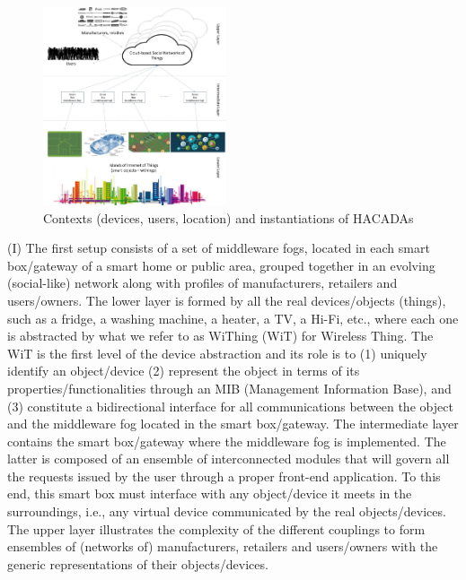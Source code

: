 \begin{figure}
	\centerline{\includegraphics[width=0.48\textwidth]{./fig2-3.jpg}}
	\vspace{-3mm} \caption{\small Contexts (devices, users, location) and instantiations of HACADAs}
	\label{fig2}
\end{figure}


(I)  The first setup consists of a set of middleware fogs, located in each smart box/gateway of a smart home or public area, grouped together in an evolving (social-like) network along with profiles of manufacturers, retailers and users/owners. The lower layer is formed by all the real devices/objects (things), such as a fridge, a washing machine, a heater, a TV, a Hi-Fi, etc., where each one is abstracted by what we refer to as WiThing (WiT) for Wireless Thing. The WiT is the first level of the device abstraction and its role is to (1) uniquely identify an object/device (2) represent the object in terms of its properties/functionalities through an MIB (Management Information Base), and (3) constitute a bidirectional interface for all communications between the object and the middleware fog located in the smart box/gateway. The intermediate layer contains the smart box/gateway where the middleware fog is implemented. The latter is composed of an ensemble of interconnected modules that will govern all the requests issued by the user through a proper front-end application. To this end, this smart box must interface with any object/device it meets in the surroundings, i.e., any virtual device communicated by the real objects/devices. The upper layer illustrates the complexity of the different couplings to form ensembles of (networks of) manufacturers, retailers and users/owners with the generic representations of their objects/devices.





